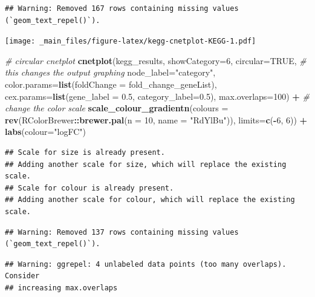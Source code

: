 \documentclass[
]{book}
\newenvironment{Shaded}{\begin{snugshade}}{\end{snugshade}}
\newcommand{\AttributeTok}[1]{\textcolor[rgb]{0.13,0.29,0.53}{#1}}
\newcommand{\CommentTok}[1]{\textcolor[rgb]{0.56,0.35,0.01}{\textit{#1}}}
\newcommand{\ConstantTok}[1]{\textcolor[rgb]{0.56,0.35,0.01}{#1}}
\newcommand{\DecValTok}[1]{\textcolor[rgb]{0.00,0.00,0.81}{#1}}
\newcommand{\FloatTok}[1]{\textcolor[rgb]{0.00,0.00,0.81}{#1}}
\newcommand{\FunctionTok}[1]{\textcolor[rgb]{0.13,0.29,0.53}{\textbf{#1}}}
\newcommand{\NormalTok}[1]{#1}
\newcommand{\SpecialCharTok}[1]{\textcolor[rgb]{0.81,0.36,0.00}{\textbf{#1}}}
\newcommand{\StringTok}[1]{\textcolor[rgb]{0.31,0.60,0.02}{#1}}
\begin{document}
\begin{verbatim}
## Warning: Removed 167 rows containing missing values (`geom_text_repel()`).
\end{verbatim}

\texttt{[image: \_main\_files/figure-latex/kegg-cnetplot-KEGG-1.pdf]}

\begin{Shaded}
\begin{Highlighting}[]
\CommentTok{\# circular cnetplot}
\FunctionTok{cnetplot}\NormalTok{(kegg\_results,  }
         \AttributeTok{showCategory=}\DecValTok{6}\NormalTok{,}
         \AttributeTok{circular=}\ConstantTok{TRUE}\NormalTok{, }\CommentTok{\# this changes the output graphing}
         \AttributeTok{node\_label=}\StringTok{"category"}\NormalTok{,}
         \AttributeTok{color.params=}\FunctionTok{list}\NormalTok{(}\AttributeTok{foldChange =}\NormalTok{ fold\_change\_geneList),}
         \AttributeTok{cex.params=}\FunctionTok{list}\NormalTok{(}\AttributeTok{gene\_label =} \FloatTok{0.5}\NormalTok{,}
                         \AttributeTok{category\_label=}\FloatTok{0.5}\NormalTok{), }
         \AttributeTok{max.overlaps=}\DecValTok{100}\NormalTok{) }\SpecialCharTok{+}
  \CommentTok{\# change the color scale}
  \FunctionTok{scale\_colour\_gradientn}\NormalTok{(}\AttributeTok{colours =} \FunctionTok{rev}\NormalTok{(RColorBrewer}\SpecialCharTok{::}\FunctionTok{brewer.pal}\NormalTok{(}\AttributeTok{n =} \DecValTok{10}\NormalTok{, }\AttributeTok{name =} \StringTok{"RdYlBu"}\NormalTok{)), }\AttributeTok{limits=}\FunctionTok{c}\NormalTok{(}\SpecialCharTok{{-}}\DecValTok{6}\NormalTok{, }\DecValTok{6}\NormalTok{)) }\SpecialCharTok{+}
  \FunctionTok{labs}\NormalTok{(}\AttributeTok{colour=}\StringTok{"logFC"}\NormalTok{)}
\end{Highlighting}
\end{Shaded}

\begin{verbatim}
## Scale for size is already present.
## Adding another scale for size, which will replace the existing scale.
## Scale for colour is already present.
## Adding another scale for colour, which will replace the existing scale.
\end{verbatim}

\begin{verbatim}
## Warning: Removed 137 rows containing missing values (`geom_text_repel()`).
\end{verbatim}

\begin{verbatim}
## Warning: ggrepel: 4 unlabeled data points (too many overlaps). Consider
## increasing max.overlaps
\end{verbatim}
\end{document}
